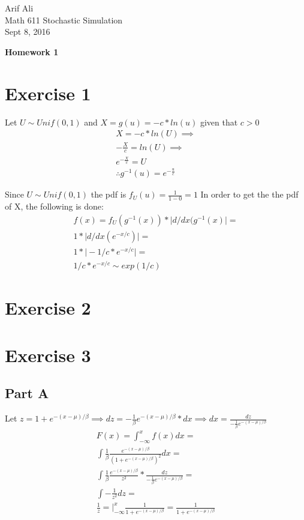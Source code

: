 \documentclass{article}\usepackage[]{graphicx}\usepackage[]{color}
\begin{document}
\begin{flushright}
Arif Ali\\
Math 611 Stochastic Simulation\\
Sept 8, 2016\\
\end{flushright}

\begin{center}
\LARGE\textbf{Homework 1}
  \end{center}
\section*{Exercise 1}
Let $U \sim Unif(0,1)$ and $X = g(u) = -c*ln(u)$ given that $c>0$
\begin{equation}
\begin{split}
X = -c*ln(U) \implies \\
-\frac{X}{c} = ln(U) \implies \\
e^{-\frac{X}{c}} = U \\
\therefore g^{-1}(u) = e^{-\frac{u}{c}}
\end{split}
\end{equation}

Since $U \sim Unif(0,1)$ the pdf is $f_U(u) = \frac{1}{1-0}=1$
In order to get the the pdf of X, the following is done:
\begin{equation}
\begin{split}
f(x)= f_U(g^{-1}(x))*\big|d/dx(g^{-1}(x)\big| = \\
1*\big|d/dx(e^{-x/c})\big| = \\
1*\big|-1/c*e^{-x/c}\big| =\\
1/c*e^{-x/c}\sim exp(1/c)
\end{split}
\end{equation}


\section*{Exercise 2}

\section*{Exercise 3}
\subsection*{Part A}

Let $z = 1+e^{-(x-\mu)/\beta} \implies dz = -\frac{1}{\beta}e^{-(x-\mu)/\beta}*dx \implies dx = \frac{dz}{-\frac{1}{\beta}e^{-(x-\mu)/\beta}}$
\begin{equation}
\begin{split}
F(x) = \int^{x}_{-\infty} f(x) dx = \\
\int\frac{1}{\beta}\frac{e^{-(x-\mu)/\beta}}{(1+e^{-(x-\mu)/\beta})^2}dx= \\
\int\frac{1}{\beta}\frac{e^{-(x-\mu)/\beta}}{z^2}*\frac{dz}{-\frac{1}{\beta}e^{-(x-\mu)/\beta}}= \\
\int-\frac{1}{z^2}dz= \\
\frac{1}{z}=\big|^{x}_{-\infty}\frac{1}{1+e^{-(x-\mu)/\beta}}=\frac{1}{1+e^{-(x-\mu)/\beta}}
\end{split}
\end{equation}
\end{document}
